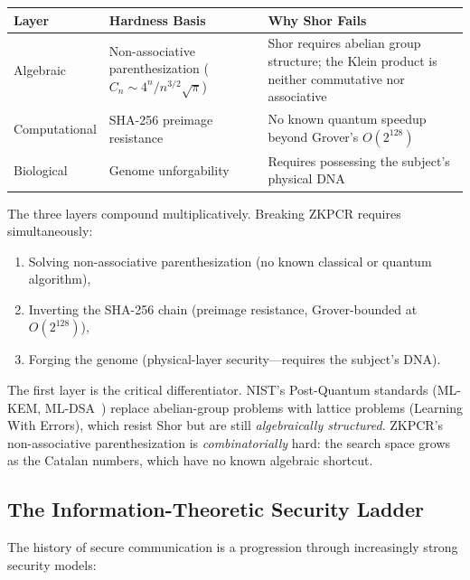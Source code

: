 \documentclass[12pt,a4paper]{article}
\begin{document}
\begin{center}
\small
\begin{tabular}{@{}p{3cm}p{3.5cm}p{4.5cm}@{}}
\toprule
\textbf{Layer} & \textbf{Hardness Basis} & \textbf{Why Shor Fails} \\
\midrule
Algebraic & Non-associative parenthesization ($C_n \sim 4^n / n^{3/2}\sqrt{\pi}$) & Shor requires abelian group structure; the Klein product is neither commutative nor associative \\
Computational & SHA-256 preimage resistance & No known quantum speedup beyond Grover's $O(2^{128})$ \\
Biological & Genome unforgability & Requires possessing the subject's physical DNA \\
\bottomrule
\end{tabular}
\end{center}

The three layers compound multiplicatively. Breaking ZKPCR requires simultaneously:
\begin{enumerate}[noitemsep]
\item Solving non-associative parenthesization (no known classical or quantum algorithm),
\item Inverting the SHA-256 chain (preimage resistance, Grover-bounded at $O(2^{128})$),
\item Forging the genome (physical-layer security---requires the subject's DNA).
\end{enumerate}

The first layer is the critical differentiator. NIST's Post-Quantum standards (ML-KEM, ML-DSA~\cite{nist2024pqc}) replace abelian-group problems with lattice problems (Learning With Errors), which resist Shor but are still \emph{algebraically structured}. ZKPCR's non-associative parenthesization is \emph{combinatorially} hard: the search space grows as the Catalan numbers, which have no known algebraic shortcut.

\subsection{The Information-Theoretic Security Ladder}
\label{subsec:security-ladder}

The history of secure communication is a progression through increasingly strong security models:
\end{document}
